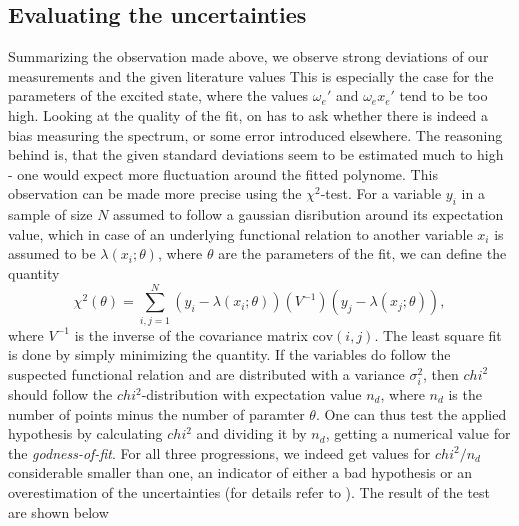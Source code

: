 \subsection{Evaluating the uncertainties}
Summarizing the observation made above, we observe strong deviations 
of our measurements and the given literature values This is especially 
the case for the parameters of the excited state, where the values 
$\omega_e'$ and $\omega_e x_e'$ tend to be too high. Looking 
at the quality of the fit, on has to ask whether there is indeed 
a bias measuring the spectrum, or some error introduced elsewhere. 
The reasoning behind is, that the given standard deviations 
seem to be estimated much to high - one would expect more fluctuation 
around the fitted polynome. This observation can be made more 
precise using the $\chi^2$-test. For a variable $y_i$ in a sample of 
size $N$ assumed to follow 
a gaussian disribution around its expectation value, which in case of 
an underlying functional relation to another variable $x_i$ is assumed 
to be $\lambda(x_i; \theta)$, where $\theta$ are the parameters of 
the fit, we can define the quantity
\begin{equation}
    \chi^2(\theta) = \sum_{i, j= 1}^N (y_i - \lambda(x_i; \theta))
        (V^{-1}) (y_j - \lambda(x_j; \theta)), 
\end{equation}
where $V^{-1}$ is the inverse of the covariance matrix $\mathrm{cov}(i,j)$. 
The least square fit is done by simply minimizing the quantity. If the 
variables do follow the suspected functional relation and are distributed 
with a variance $\sigma_i^2$, then $chi^2$ should follow the 
$chi^2$-distribution with expectation value $n_d$, where $n_d$ is 
the number of points minus the number of paramter $\theta$.
One can thus test the applied hypothesis by calculating $chi^2$ and 
dividing it by $n_d$, getting a numerical value for the 
\emph{godness-of-fit}. For all three progressions, 
we indeed get values for $chi^2 / n_d$ considerable smaller than one, 
an indicator of either a bad hypothesis or an overestimation 
of the uncertainties (for details refer to \cite{cowan1998statistical}).
The result of the test are shown below
